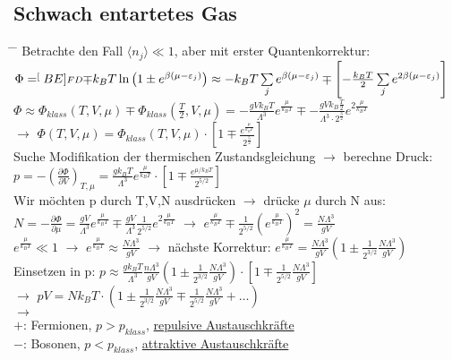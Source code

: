 \subsection{Schwach entartetes Gas}
\begin{tabbing}
\hspace{4em} \= \hspace{5em} \= \kill
Betrachte den Fall $\langle n_j \rangle \ll 1$, aber mit erster Quantenkorrektur:\\
$\Phi = \stackrel[\scriptstyle{BE}]{\scriptstyle{FD}}{\mp} k_B T \ln\left(1\pm e^{\beta (\mu - \varepsilon_j)}\right)\approx - k_B T \sum\limits_j e^{\beta(\mu - \varepsilon_j)}\mp \left[-\frac{k_B T}{2}\sum\limits_j e^{2 \beta (\mu - \varepsilon_j)} \right]$\\
$\Phi \approx \Phi_{klass}(T,V,\mu) \mp \Phi_{klass}(\frac{T}{2},V,\mu) = -\frac{g V k_B T}{\Lambda^3}e^{\frac{\mu}{k_B T}}\mp -\frac{g V k_B \frac{T}{2}}{\Lambda^3\cdot2^{\frac{3}{2}}} e^{2\frac{\mu}{k_B T}}$\\
$\rightarrow$\> $\Phi(T,V,\mu) = \Phi_{klass}(T,V,\mu)\cdot\left[1\mp\frac{e^{\frac{\mu}{k_B T}}}{2^{\frac{5}{2}}}\right]$\\
Suche Modifikation der thermischen Zustandsgleichung $\rightarrow$ berechne Druck:\\
\> $p = -\left(\frac{\partial \Phi}{\partial V}\right)_{T,\mu} = \frac{g k_B T}{\Lambda^3} e^{\frac{\mu}{k_B T}}\cdot \left[1\mp\frac{e^{\mu/k_B T}}{2^{5/2}}\right]$\\
Wir möchten p durch T,V,N ausdrücken $\rightarrow$ drücke $\mu$ durch N aus:\\
\> $N = -\frac{\partial \Phi}{\partial \mu} = \frac{g V}{\Lambda^3}e^{\frac{\mu}{k_B T}} \mp \frac{g V}{\Lambda^3} \frac{1}{2^{5/2}}e^{2\frac{\mu}{k_B T}}$ $\rightarrow$ $e^{\frac{\mu}{k_B T}} \mp \frac{1}{2^{5/2}}\left(e^{\frac{\mu}{k_B T}}\right)^2 = \frac{N \Lambda^3}{g V}$\\
$e^{\frac{\mu}{k_B T}} \ll 1$ $\rightarrow$ $e^{\frac{\mu}{k_B T}} \approx \frac{N \Lambda^3}{g V}$ $\rightarrow$ nächste Korrektur: $e^{\frac{\mu}{k_B T}} = \frac{N \Lambda^3}{g V} \left(1 \pm \frac{1}{2^{3/2}}\frac{N \Lambda^3}{g V}\right)$\\
Einsetzen in p: $p \approx \frac{g k_B T}{\Lambda^3}\frac{n \Lambda^3}{g V}\left(1 \pm \frac{1}{2^{3/2}}\frac{N \Lambda^3}{g V}\right)\cdot \left[1 \mp \frac{1}{2^{5/2}}\frac{N \Lambda^3}{g V}\right]$\\
$\rightarrow$\> $p V = N k_B T \cdot \left(1 \pm \frac{1}{2^{3/2}}\frac{N \Lambda^3}{g V} \mp \frac{1}{2^{5/2}}\frac{N \Lambda^3}{g V} + \dots\right)$\\
$\rightarrow$\> \\
\glqq $+$\grqq: \> Fermionen,\> $p > p_{klass}$, \underline{repulsive Austauschkräfte}\\
\glqq $-$\grqq: \> Bosonen,\> $p < p_{klass}$, \underline{attraktive Austauschkräfte}
\end{tabbing}



